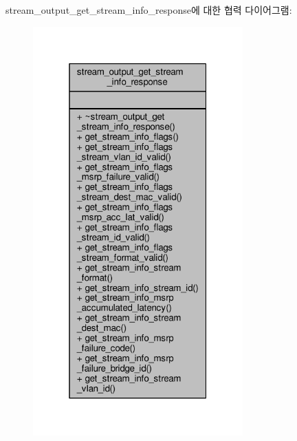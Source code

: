 stream\+\_\+output\+\_\+get\+\_\+stream\+\_\+info\+\_\+response에 대한 협력 다이어그램\+:
\nopagebreak
\begin{figure}[H]
\begin{center}
\leavevmode
\includegraphics[width=229pt]{classavdecc__lib_1_1stream__output__get__stream__info__response__coll__graph}
\end{center}
\end{figure}
